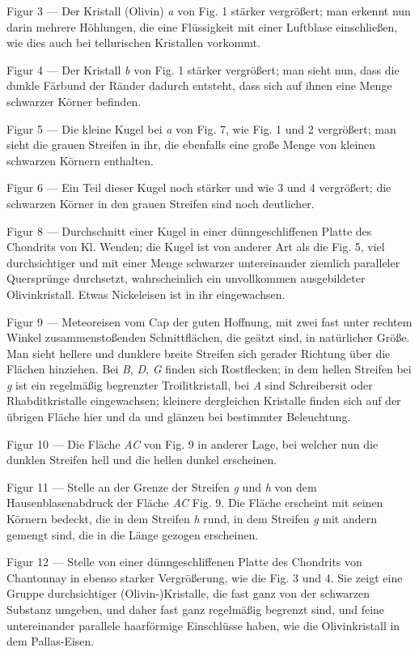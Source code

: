\documentclass[a4paper, 11pt, oneside]{article}
\begin{document}
Figur 3 — Der Kristall (Olivin) \emph{a} von Fig. 1 stärker vergrößert; man erkennt nun darin mehrere Höhlungen, die eine Flüssigkeit mit einer Luftblase einschließen, wie dies auch bei tellurischen Kristallen vorkommt.

Figur 4 — Der Kristall \emph{b} von Fig. 1 stärker vergrößert; man sieht nun, dass die dunkle Färbund der Ränder dadurch entsteht, dass sich auf ihnen eine Menge schwarzer Körner befinden.

Figur 5 — Die kleine Kugel bei \emph{a} von Fig. 7, wie Fig. 1 und 2 vergrößert; man sieht die grauen Streifen in ihr, die ebenfalls eine große Menge von kleinen schwarzen Körnern enthalten.

Figur 6 — Ein Teil dieser Kugel noch stärker und wie 3 und 4 vergrößert; die schwarzen Körner in den grauen Streifen sind noch deutlicher.

Figur 8 — Durchschnitt einer Kugel in einer dünngeschliffenen Platte des Chondrits von Kl. Wenden; die Kugel ist von anderer Art als die Fig. 5, viel durchsichtiger und mit einer Menge schwarzer untereinander ziemlich paralleler Quersprünge durchsetzt, wahrscheinlich ein unvollkommen ausgebildeter Olivinkristall. Etwas Nickeleisen ist in ihr eingewachsen.

Figur 9 — Meteoreisen vom Cap der guten Hoffnung, mit zwei fast unter rechtem Winkel zusammenstoßenden Schnittflächen, die geätzt sind, in natürlicher Größe. Man sieht hellere und dunklere breite Streifen sich gerader Richtung über die Flächen hinziehen. Bei \emph{B}, \emph{D}, \emph{G} finden sich Rostflecken; in dem hellen Streifen bei \emph{g} ist ein regelmäßig begrenzter Troilitkristall, bei \emph{A} sind Schreibersit oder Rhabditkristalle eingewachsen; kleinere dergleichen Kristalle finden sich auf der übrigen Fläche hier und da und glänzen bei bestimmter Beleuchtung.

Figur 10 — Die Fläche \emph{AC} von Fig. 9 in anderer Lage, bei welcher nun die dunklen Streifen hell und die hellen dunkel erscheinen.

Figur 11 — Stelle an der Grenze der Streifen \emph{g} und \emph{h} von dem Hausenblasenabdruck der Fläche \emph{AC} Fig. 9. Die Fläche erscheint mit seinen Körnern bedeckt, die in dem Streifen \emph{h} rund, in dem Streifen \emph{g} mit andern gemengt sind, die in die Länge gezogen erscheinen.

Figur 12 — Stelle von einer dünngeschliffenen Platte des Chondrits von Chantonnay in ebenso starker Vergrößerung, wie die Fig. 3 und 4. Sie zeigt eine Gruppe durchsichtiger (Olivin-)Kristalle, die fast ganz von der schwarzen Substanz umgeben, und daher fast ganz regelmäßig begrenzt sind, und feine untereinander parallele haarförmige Einschlüsse haben, wie die Olivinkristall in dem Pallas-Eisen.
\end{document}
